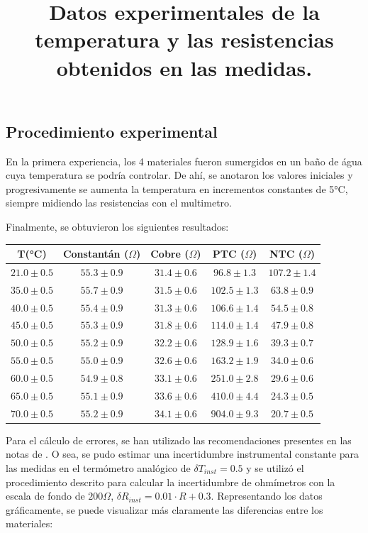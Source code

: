 \documentclass[a4paper,12pt]{article}
\begin{document}
\subsection{Procedimiento experimental}
En la primera experiencia, los 4 materiales fueron sumergidos en un baño de água cuya temperatura se podría controlar.
De ahí, se anotaron los valores iniciales y progresivamente se aumenta la temperatura en incrementos constantes de 5°C, siempre midiendo las resistencias con el multimetro. 

Finalmente, se obtuvieron los siguientes resultados:
\begin{table}[h!]
    \title{\textbf{Datos experimentales de la temperatura y las resistencias obtenidos en las medidas.
    }}
    \centering
     \begin{tabular}{||c|c|c|c|c||} 
     \hline
     T(°C) & Constantán ($\Omega$) & Cobre ($\Omega$) & PTC ($\Omega$) & NTC ($\Omega$)\\  
     \hline
     $21.0 \pm 0.5$ & $55.3 \pm 0.9 $ & $31.4 \pm 0.6 $ & $96.8 \pm 1.3$ & $107.2 \pm 1.4$\\ 
     \hline
     $35.0 \pm 0.5$ & $55.7\pm 0.9$ & $31.5 \pm 0.6$ & $102.5 \pm 1.3$ & $63.8 \pm 0.9$ \\
     \hline
     $40.0\pm 0.5$ & $55.4\pm 0.9$ & $31.3\pm 0.6$ & $106.6\pm 1.4$  & $54.5\pm 0.8$ \\ \hline
     $45.0\pm 0.5$ & $55.3\pm 0.9$ & $31.8\pm 0.6$ & $114.0\pm 1.4$  & $47.9\pm 0.8$ \\ \hline
     $50.0\pm 0.5$ & $55.2\pm 0.9$ & $32.2\pm 0.6$ & $128.9\pm 1.6$  & $39.3\pm 0.7$ \\ \hline
     $55.0\pm 0.5$ & $55.0\pm 0.9$ & $32.6\pm 0.6$ & $163.2\pm 1.9$  & $34.0\pm 0.6$ \\ \hline
     $60.0\pm 0.5$ & $54.9\pm 0.8$ & $33.1\pm 0.6$ & $251.0\pm 2.8$  & $29.6 \pm 0.6$\\ \hline
     $65.0\pm 0.5$ & $55.1\pm 0.9$ & $33.6\pm 0.6$ & $410.0\pm 4.4$  & $24.3 \pm 0.5$\\ \hline
     $70.0\pm 0.5$ & $55.2\pm 0.9$ & $34.1\pm 0.6$ & $904.0\pm 9.3$  & $20.7\pm 0.5$ \\ \hline 
     \end{tabular}
\end{table}

Para el cálculo de errores, se han utilizado las recomendaciones presentes en las notas de \citeauthor{Max}. O sea, se pudo estimar una incertidumbre instrumental constante para las medidas en el termómetro analógico de $\delta T_{inst} = 0.5$ y se utilizó el procedimiento descrito para calcular la incertidumbre de ohmímetros con la escala de fondo de $200\Omega$, $\delta R_{inst} = 0.01\cdot R + 0.3$. Representando los datos gráficamente, se puede visualizar más claramente las diferencias entre los materiales:
\end{document}
